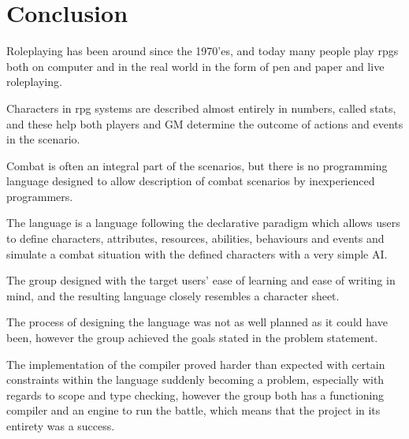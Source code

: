 \chapter{Conclusion}
Roleplaying has been around since the 1970'es, and today many people play \ac{rpg}s both on computer and in the real world in the form of pen and paper and live roleplaying.

Characters in \ac{rpg} systems are described almost entirely in numbers, called stats, and these help both players and \ac{GM} determine the outcome of actions and events in the scenario. 

Combat is often an integral part of the scenarios, but there is no programming language designed to allow description of combat scenarios by inexperienced programmers.

The language \langname{} is a language following the declarative paradigm which allows users to define characters, attributes, resources, abilities, behaviours and events and simulate a combat situation with the defined characters with a very simple AI.

The group designed \langname{} with the target users' ease of learning and ease of writing in mind, and the resulting language closely resembles a character sheet. 

The process of designing the language was not as well planned as it could have been, however the group achieved the goals stated in the problem statement.

The implementation of the compiler proved harder than expected with certain constraints within the language suddenly becoming a problem, especially with regards to scope and type checking, however the group both has a functioning compiler and an engine to run the battle, which means that the project in its entirety was a success.